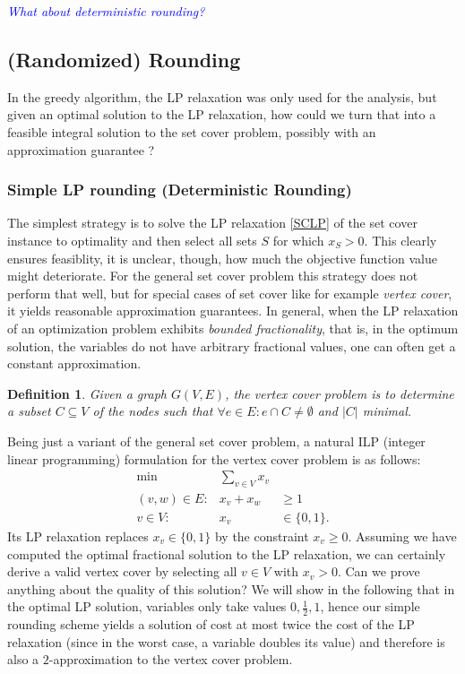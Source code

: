 \documentclass{article}
\newtheorem{definition}{Definition}
\begin{document}
\textcolor{blue}{\emph{What about deterministic rounding?}}

\subsection{(Randomized) Rounding}
In the greedy algorithm, the LP relaxation was only used for the analysis, but given an optimal solution to the LP relaxation, how could we turn that into a feasible integral solution to the set cover problem, possibly with an approximation guarantee ?

\subsubsection{Simple LP rounding (Deterministic Rounding)}
The simplest strategy is to solve the  LP relaxation \ref{SCLP} of the  set cover instance to optimality and then select all sets $S$ for which $x_S>0$. This clearly ensures feasiblity, it is unclear, though, how much the objective function value might deteriorate. 
For the general set cover problem this strategy does not perform that well, but for special cases of set cover like for example \emph{vertex cover}, it yields reasonable approximation guarantees. In general, when the LP relaxation of an optimization problem exhibits \emph{bounded fractionality}, that is, in the optimum solution, the variables do not have arbitrary fractional values, one can often get a constant approximation.

\begin{definition}
Given a graph $G(V,E)$, the \emph{vertex cover} problem is to determine a subset $C\subseteq V$ of the nodes
such that $\forall e\in E: e\cap C\neq \emptyset$ and $|C|$ minimal.
\end{definition}

Being just a variant of the general set cover problem, a natural ILP (integer linear programming) formulation for the vertex cover problem is as follows:
\begin{eqnarray}\label{VCILP}
\mbox{min} & \displaystyle \sum_{v \in V} x_v\\
 (v,w)\in E: & x_v+x_w  & \geq 1 \nonumber\\
 v \in V: & x_v  & \in \{0,1\}. \nonumber
\end{eqnarray}
Its LP relaxation replaces $x_v \in \{0,1\}$ by the constraint $x_v\geq 0$. Assuming we have computed the optimal fractional solution to the LP relaxation, we can certainly derive a valid vertex cover by selecting all $v\in V$ with $x_v>0$. Can we prove anything about the quality of this solution? We will show in the following that in the optimal LP solution, variables only take values $0,\frac{1}{2},1$, hence our simple rounding scheme yields a solution of cost at most twice the cost of the LP relaxation (since in the worst case, a variable doubles its value) and therefore is also a $2$-approximation to the vertex cover problem.
\end{document}
